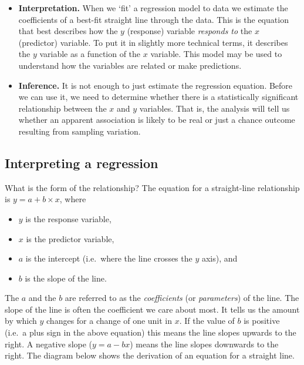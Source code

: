 \documentclass[
]{book}
\begin{document}
\begin{itemize}
\item
  \textbf{Interpretation.} When we `fit' a regression model to data we estimate the coefficients of a best-fit straight line through the data. This is the equation that best describes how the \(y\) (response) variable \emph{responds to} the \(x\) (predictor) variable. To put it in slightly more technical terms, it describes the \(y\) variable as a function of the \(x\) variable. This model may be used to understand how the variables are related or make predictions.
\item
  \textbf{Inference.} It is not enough to just estimate the regression equation. Before we can use it, we need to determine whether there is a statistically significant relationship between the \(x\) and \(y\) variables. That is, the analysis will tell us whether an apparent association is likely to be real or just a chance outcome resulting from sampling variation.
\end{itemize}

\hypertarget{interpreting-a-regression}{%
\subsection{Interpreting a regression}\label{interpreting-a-regression}}

What is the form of the relationship? The equation for a straight-line relationship is \(y = a + b \times x\), where

\begin{itemize}
\item
  \(y\) is the response variable,
\item
  \(x\) is the predictor variable,
\item
  \(a\) is the intercept (i.e.~where the line crosses the \(y\) axis), and
\item
  \(b\) is the slope of the line.
\end{itemize}

The \(a\) and the \(b\) are referred to as the \emph{coefficients} (or \emph{parameters}) of the line. The slope of the line is often the coefficient we care about most. It tells us the amount by which \(y\) changes for a change of one unit in \(x\). If the value of \(b\) is positive (i.e.~a plus sign in the above equation) this means the line slopes upwards to the right. A negative slope (\(y = a - bx\)) means the line slopes downwards to the right. The diagram below shows the derivation of an equation for a straight line.
\end{document}
